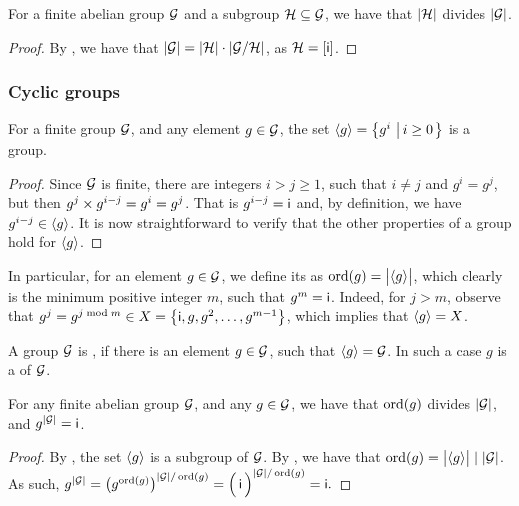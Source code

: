
\begin{lemma}
    For a finite abelian group $\mathcal{G}$ and a subgroup $\mathcal{H}
    \subseteq \mathcal{G}$, we have that $\left| {\mathcal{H}} \right|$ divides
    $\left| {\mathcal{G}} \right|$.
\end{lemma}

\begin{proof}
    By , we have that $\left| {\mathcal{G}} \right| =
    \left| {\mathcal{H}} \right| \cdot \left| {\mathcal{G} / \mathcal{H}} \right|$, as $\mathcal{H} =
    [\mathsf{i}]$.
\end{proof}

\subsubsection{Cyclic groups}

\begin{lemma}
    For a finite group $\mathcal{G}$, and any element $g\in\mathcal{G}$, 
    the set $\left\langle {g} \right\rangle = \left\{ { g^i \,\left|\, { i\geq 0} \bigr.\right.} \right\}$ is a group.
\end{lemma}

\begin{proof}
    Since $\mathcal{G}$ is finite, there are integers $i > j\geq 1$, such
    that $i \neq j$ and $g^i = g^j$, but then $g^j\times g^{i-j} =g^i =
    g^j$. That is $g^{i-j} = \mathsf{i}$ and, by definition, we have
    $g^{i-j} \in \left\langle {g} \right\rangle$. It is now straightforward to verify that
    the other properties of a group hold for $\left\langle {g} \right\rangle$.
\end{proof}


In particular, for an element $g \in \mathcal{G}$, we define its
 as $\ordX{g} = \cardin{\bigl. \permut{g}}$, which
clearly is the minimum positive integer $m$, such that $g^m =
\mathsf{i}$. Indeed, for $j > m$, observe that $g^j = g^{j \bmod m} \in X
= \left\{ { \mathsf{i}, g, g^2, \ldots, g^{m-1}} \right\}$, which implies that
$\left\langle {g} \right\rangle = X$.

A group $\mathcal{G}$ is , if there is an element $g \in
\mathcal{G}$, such that $\left\langle {g} \right\rangle = \mathcal{G}$. In such a case $g$ is a
 of $\mathcal{G}$.

\begin{lemma}
    For any finite abelian group $\mathcal{G}$, and any $g \in \mathcal{G}$, we
    have that $\ordX{g}$ divides $\left| {\mathcal{G}} \right|$, and
    $g^{\left| {\mathcal{G}} \right|} = \mathsf{i}$.
\end{lemma}
\begin{proof}
    By , the set $\left\langle {g} \right\rangle$ is a subgroup
    of $\mathcal{G}$. By , we have that $\ordX{g} =
    \cardin{\bigl. \permut{g}} \divides \cardin{\Group}$.
    As such, 
    \begin{math}
        g^{\cardin{\Group}}%
        =%
        \pth[]{g^{\ordX[]{g}}}^{\cardin{\Group} / \ordX[]{ g}}%
        =%
        \pth[]{\Bigl.\, \gIdent \,}^{\cardin{\Group} / \ordX[]{ g}}%
        =%
        \gIdent.
    \end{math}
\end{proof}

